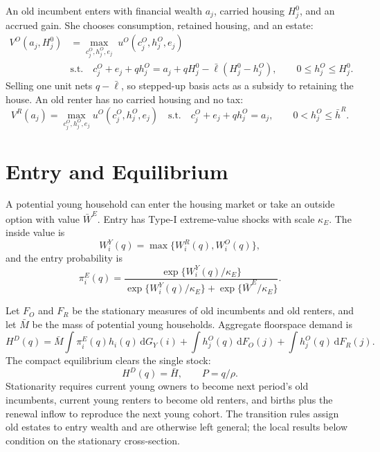 \documentclass[11pt]{article}
\newcommand{\dd}{\mathrm d}
\newcommand{\1}{\mathbf 1}
\begin{document}
An old incumbent enters with financial wealth $a_j$, carried housing $H_j^0$,
and an accrued gain. She chooses consumption, retained housing, and an estate:
\begin{equation}
\begin{aligned}
V^O(a_j,H_j^0)
&=
\max_{c_j^O,h_j^O,e_j}
\;u^O(c_j^O,h_j^O,e_j)\\
&\text{s.t.}\quad
c_j^O+e_j+q h_j^O
=
a_j+qH_j^0-\bar\ell(H_j^0-h_j^O),
\qquad
0\le h_j^O\le H_j^0.
\end{aligned}
\label{eq:compact_old_problem}
\end{equation}
Selling one unit nets $q-\bar\ell$, so stepped-up basis acts as a subsidy to
retaining the house. An old renter has no carried housing and no tax:
\begin{equation}
V^R(a_j)
=
\max_{c_j^O,h_j^O,e_j}
u^O(c_j^O,h_j^O,e_j)
\quad
\text{s.t.}\quad
c_j^O+e_j+q h_j^O=a_j,\qquad 0<h_j^O\le \bar h^R.
\label{eq:compact_old_renter_problem}
\end{equation}

\section{Entry and Equilibrium}

A potential young household can enter the housing market or take an outside
option with value $\bar W^E$. Entry has Type-I extreme-value shocks with scale
$\kappa_E$. The inside value is
\[
W_i^Y(q)=\max\{W_i^R(q),W_i^O(q)\},
\]
and the entry probability is
\begin{equation}
\pi_i^E(q)
=
\frac{\exp\{W_i^Y(q)/\kappa_E\}}
{\exp\{W_i^Y(q)/\kappa_E\}+\exp\{\bar W^E/\kappa_E\}}.
\label{eq:compact_entry}
\end{equation}

Let $F_O$ and $F_R$ be the stationary measures of old incumbents and old
renters, and let $\bar M$ be the mass of potential young households. Aggregate
floorspace demand is
\begin{equation}
H^D(q)
=
\bar M\int \pi_i^E(q)h_i(q)\,\dd G_Y(i)
+\int h_j^O(q)\,\dd F_O(j)
+\int h_j^O(q)\,\dd F_R(j).
\label{eq:compact_hd}
\end{equation}
The compact equilibrium clears the single stock:
\begin{equation}
    H^D(q)=\bar H,
    \qquad
    P=q/\rho.
\label{eq:compact_clearing}
\end{equation}
Stationarity requires current young owners to become next period's old
incumbents, current young renters to become old renters, and births plus the
renewal inflow to reproduce the next young cohort. The transition rules assign
old estates to entry wealth and are otherwise left general; the local results
below condition on the stationary cross-section.
\end{document}
